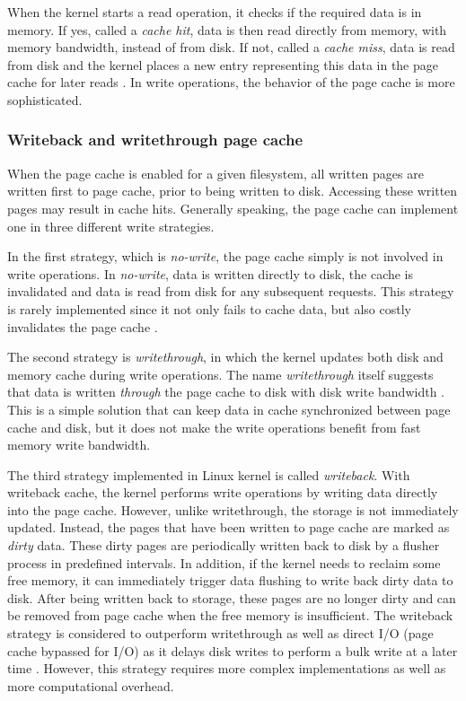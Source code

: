 When the kernel starts a read operation, it checks if the required data is 
in memory. If yes, called a \textit{cache hit}, data is then read directly 
from memory, with memory bandwidth, instead of from disk. 
If not, called a \textit{cache miss}, data is read from disk and the kernel 
places a new entry representing this data in the page cache for later reads 
\cite{linuxdev3rd2010}. 
In write operations, the behavior of the page cache is more sophisticated.

\subsubsection{Writeback and writethrough page cache}

When the page cache is enabled for a given filesystem, all written pages 
are written first to page cache, prior to being written to disk.
Accessing these written pages may result in cache hits.
Generally speaking, the page cache can implement one in three 
different write strategies.

In the first strategy, which is \textit{no-write}, the page cache simply 
is not involved in write operations. In \textit{no-write}, data is written 
directly to disk, the cache is invalidated and data is read from disk for any 
subsequent requests. 
This strategy is rarely implemented since it not only fails to cache data, 
but also costly invalidates the page cache \cite{linuxdev3rd2010}.

The second strategy is \textit{writethrough}, in which the kernel updates both 
disk and memory cache during write operations. The name \textit{writethrough} 
itself suggests that data is written \textit{through} the page cache to disk 
with disk write bandwidth \cite{linuxdev3rd2010}.
This is a simple solution that can keep data in cache synchronized 
between page cache and disk, but it does not make the write operations 
benefit from fast memory write bandwidth. 

The third strategy implemented in Linux kernel is called \textit{writeback}. 
With writeback cache, the kernel performs write operations by writing data 
directly into the page cache. However, unlike writethrough, the storage is not 
immediately updated. Instead, the pages that have been written to page cache 
are marked as \textit{dirty} data. These dirty pages are periodically written 
back to disk by a flusher process in predefined intervals. 
In addition, if the kernel needs to reclaim some free memory, it can 
immediately trigger data flushing to write back dirty data to disk. 
After being written back to storage, these pages are no longer dirty 
and can be removed from page cache when the free memory is insufficient.
The writeback strategy is considered to outperform writethrough as well as
direct I/O (page cache bypassed for I/O) as it delays disk writes to perform 
a bulk write at a later time \cite{linuxdev3rd2010}. 
However, this strategy requires more complex implementations as well as  
more computational overhead. 

